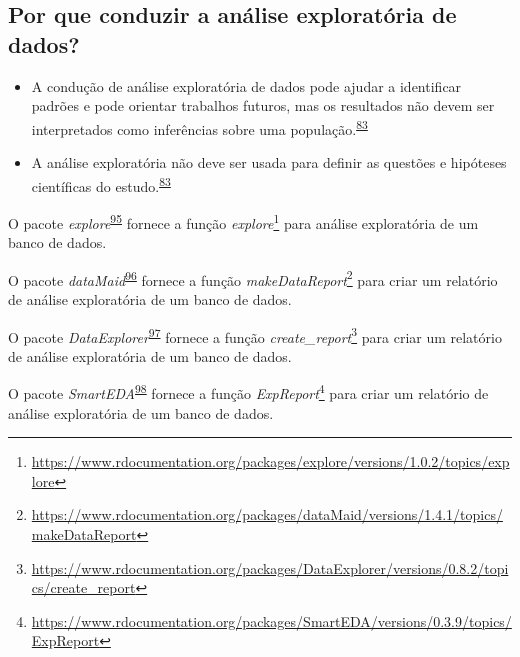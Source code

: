 \documentclass[
  a4paper,
]{book}
\renewcommand{\href}[2]{#2\footnote{\url{#1}}}
\newenvironment{infobox}[1]
  {
  \begin{itemize}
  \renewcommand{\labelitemi}{
    \raisebox{-.7\height}[0pt][0pt]{
      {\setkeys{Gin}{width=3em,keepaspectratio}
        \texttt{[image: \#1]}}
    }
  }
  \setlength{\fboxsep}{1em}
  \begin{blackbox}
  \item
  }
  {
  \end{blackbox}
  \end{itemize}
  }
\begin{document}
\hypertarget{por-que-conduzir-a-anuxe1lise-exploratuxf3ria-de-dados}{%
\subsection{Por que conduzir a análise exploratória de dados?}\label{por-que-conduzir-a-anuxe1lise-exploratuxf3ria-de-dados}}

\begin{itemize}
\item
  A condução de análise exploratória de dados pode ajudar a identificar padrões e pode orientar trabalhos futuros, mas os resultados não devem ser interpretados como inferências sobre uma população.\textsuperscript{\protect\hyperlink{ref-zuur2009}{83}}
\item
  A análise exploratória não deve ser usada para definir as questões e hipóteses científicas do estudo.\textsuperscript{\protect\hyperlink{ref-zuur2009}{83}}
\end{itemize}

\begin{infobox}{images/Rlogo}
O pacote \emph{explore}\textsuperscript{\protect\hyperlink{ref-explore}{95}} fornece a função \href{https://www.rdocumentation.org/packages/explore/versions/1.0.2/topics/explore}{\emph{explore}} para análise exploratória de um banco de dados.

\end{infobox}

\begin{infobox}{images/Rlogo}
O pacote \emph{dataMaid}\textsuperscript{\protect\hyperlink{ref-dataMaid}{96}} fornece a função \href{https://www.rdocumentation.org/packages/dataMaid/versions/1.4.1/topics/makeDataReport}{\emph{makeDataReport}} para criar um relatório de análise exploratória de um banco de dados.

\end{infobox}

\begin{infobox}{images/Rlogo}
O pacote \emph{DataExplorer}\textsuperscript{\protect\hyperlink{ref-DataExplorer-2}{97}} fornece a função \href{https://www.rdocumentation.org/packages/DataExplorer/versions/0.8.2/topics/create_report}{\emph{create\_report}} para criar um relatório de análise exploratória de um banco de dados.

\end{infobox}

\begin{infobox}{images/Rlogo}
O pacote \emph{SmartEDA}\textsuperscript{\protect\hyperlink{ref-SmartEDA}{98}} fornece a função \href{https://www.rdocumentation.org/packages/SmartEDA/versions/0.3.9/topics/ExpReport}{\emph{ExpReport}} para criar um relatório de análise exploratória de um banco de dados.

\end{infobox}
\end{document}
